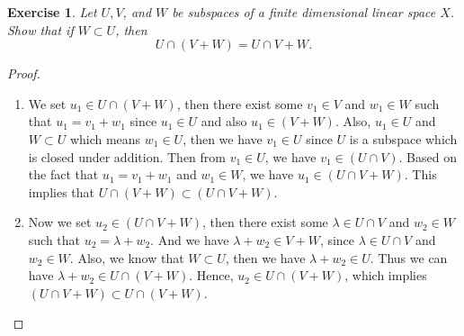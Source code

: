 \documentclass[11pt]{book}
\newtheorem{exercise}{Exercise}[section]
\theoremstyle{definition}
\numberwithin{equation}{chapter}
\begin{document}
\medskip

\begin{exercise}\label{ex_3}
Let $U, V$, and $W$ be subspaces of a finite dimensional linear space $X$. Show that if $W\subset U$, then 
$$U\cap (V + W) = U\cap V + W.$$
\end{exercise}
\begin{proof}
~\begin{enumerate}[label=(\alph*)]
    \item We set $u_1 \in U \cap (V+W)$, then there exist some $v_1 \in V$ and $w_1 \in W$ such that $u_1 = v_1 + w_1$ since $u_1 \in U$ and also $u_1 \in (V+W)$. Also, $u_1 \in U$ and $W \subset U$ which means $w_1 \in U$, then we have $v_1 \in U$ since $U$ is a subspace which is closed under addition. Then from $v_1 \in U$, we have $v_1 \in (U \cap V)$. Based on the fact that $u_1 = v_1 + w_1$ and $w_1 \in W$, we have $u_1 \in (U \cap V + W)$. This implies that $U \cap (V+W) \subset (U \cap V + W)$.
    \item Now we set $u_2 \in (U \cap V + W)$, then there exist some $\lambda \in U \cap V$ and $w_2 \in W$ such that $u_2 = \lambda + w_2$. And we have $\lambda + w_2 \in V+W$, since $\lambda \in U \cap V$ and $w_2 \in W$. Also, we know that $W \subset U$, then we have $\lambda + w_2 \in U$. Thus we can have $\lambda + w_2 \in U \cap (V+W)$. Hence, $u_2 \in U \cap (V+W)$, which implies $(U \cap V + W) \subset U \cap (V+W)$.
\end{enumerate}
\end{proof}

\medskip
\end{document}
